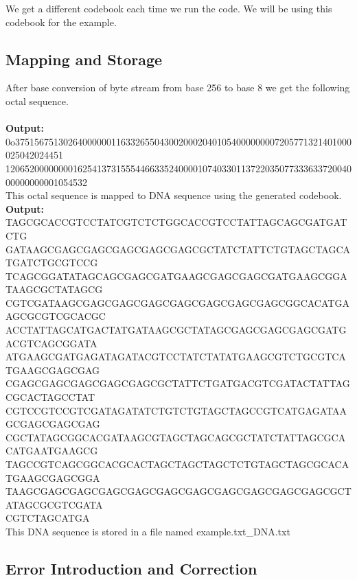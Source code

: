 \documentclass[11pt]{article}
\begin{document}
We get a different codebook each time we run the code. We will be using this codebook for the example.

\subsection{Mapping and Storage}

After base conversion of byte stream from base 256 to base 8 we get the following octal sequence. \\ \\
\textbf{Output:} 0o3751567513026400000011633265504300200020401054000000007205771321401000025042024451 \\ 12065200000000162541373155544663352400001074033011372203507733363372004000000000001054532 \\

This octal sequence is mapped to DNA sequence using the generated codebook. \\

\textbf{Output:} TAGCGCACCGTCCTATCGTCTCTGGCACCGTCCTATTAGCAGCGATGATCTG \\ GATAAGCGAGCGAGCGAGCGAGCGAGCGCTATCTATTCTGTAGCTAGCATGATCTGCGTCCG \\ TCAGCGGATATAGCAGCGAGCGATGAAGCGAGCGAGCGATGAAGCGGATAAGCGCTATAGCG \\ CGTCGATAAGCGAGCGAGCGAGCGAGCGAGCGAGCGAGCGGCACATGAAGCGCGTCGCACGC \\ ACCTATTAGCATGACTATGATAAGCGCTATAGCGAGCGAGCGAGCGATGACGTCAGCGGATA \\ ATGAAGCGATGAGATAGATACGTCCTATCTATATGAAGCGTCTGCGTCATGAAGCGAGCGAG \\ CGAGCGAGCGAGCGAGCGAGCGCTATTCTGATGACGTCGATACTATTAGCGCACTAGCCTAT \\ CGTCCGTCCGTCGATAGATATCTGTCTGTAGCTAGCCGTCATGAGATAAGCGAGCGAGCGAG \\ CGCTATAGCGGCACGATAAGCGTAGCTAGCAGCGCTATCTATTAGCGCACATGAATGAAGCG \\ TAGCCGTCAGCGGCACGCACTAGCTAGCTAGCTCTGTAGCTAGCGCACATGAAGCGAGCGGA \\ TAAGCGAGCGAGCGAGCGAGCGAGCGAGCGAGCGAGCGAGCGAGCGCTATAGCGCGTCGATA \\ CGTCTAGCATGA
\\

This DNA sequence is stored in a file named example.txt\_DNA.txt

\subsection{Error Introduction and Correction}
\end{document}
